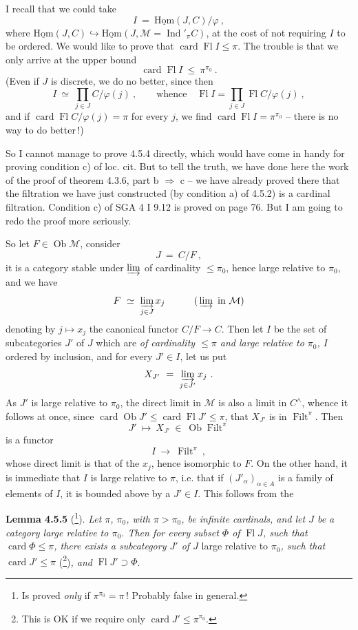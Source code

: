 \documentclass[11pt]{article}
\newcommand{\printedpage}[1]{\marginpar{\footnotesize p.~#1}}
\newcommand{\msp}[1]{\marginpar{\footnotesize [#1]}}
\newcommand{\card}{\operatorname{card}}
\newcommand{\Fl}{\operatorname{Fl}}
\newcommand{\Ob}{\operatorname{Ob}}
\newcommand{\Ind}{\operatorname{Ind}}
\newcommand{\Filt}{\operatorname{Filt}}
\newcommand{\uHom}{\underline{\mathrm{Hom}}}
\begin{document}
\msp{page 111}

I recall that we could take
\[
I \ =\ \uHom(J,C)/\varphi\ ,
\]
where $\uHom(J,C) \hookrightarrow \uHom(J, \mathcal{M} = \Ind'_{\pi}C)$, at the cost of not requiring $I$ to be ordered. We would like to prove that $\card\Fl I \leqslant \pi$. The trouble is that we only arrive at the upper bound
\[
\card\Fl I \ \leqslant\ \pi^{\pi_0}\ .
\]
(Even if $J$ is discrete, we do no better, since then
\[
I \ \simeq\ \prod_{j\in J} C/\varphi(j)\ , \qquad \text{whence} \quad \Fl I = \prod_{j\in J} \Fl C/\varphi(j)\ ,
\]
and if $\card\Fl C/\varphi(j) = \pi$ for every $j$, we find $\card\Fl I = \pi^{\pi_0}$ -- there is no way to do better\,!)

So I cannot manage to prove 4.5.4 directly, which would have come in handy for proving condition c) of loc. cit. But to tell the truth, we have done here the work of the proof of theorem 4.3.6, part b $\Longrightarrow$ c -- we have already proved there that the filtration we have just constructed (by condition a) of 4.5.2) is a cardinal filtration. Condition c) of SGA 4 I 9.12 is proved on page 76. But I am going to redo
\msp{page 112}
the proof more seriously.

So let $F \in \Ob\mathcal{M}$, consider
\[
J \ =\ C/F\ ,
\]
it is a category stable under $\varinjlim$ of cardinality $\leqslant \pi_0$, hence large relative to $\pi_0$, and we have
\[
F \ \simeq\ \varinjlim_{j\in J} x_j \qquad\quad (\,\varinjlim \ \text{in } \mathcal{M})
\]
\printedpage{32}
denoting by $j \longmapsto x_j$ the canonical functor $C/F \longrightarrow C$. Then let $I$ be the set of subcategories $J'$ of $J$ which are \textit{of cardinality $\leqslant \pi$ and large relative to $\pi_0$, $I$} ordered by inclusion, and for every $J' \in I$, let us put
\[
X_{J'} \ =\ \varinjlim_{j\in J'} x_j\ .
\]
As $J'$ is large relative to $\pi_0$, the direct limit in $\mathcal{M}$ is also a limit in $C^{\wedge}$, whence it follows at once, since $\card\Ob J' \leqslant \card\Fl J' \leqslant \pi$, that $X_{J'}$ is in $\Filt^{\pi}$. Then
\[
J' \ \longmapsto\ X_{J'} \ \in\ \Ob\Filt^{\pi}
\]
is a functor
\[
I \ \longrightarrow\ \Filt^{\pi}\ ,
\]
whose direct limit is that of the $x_j$, hence isomorphic to $F$. On the other hand, it is immediate that $I$ is large relative to $\pi$, i.e. that if $(J'_{\alpha})_{\alpha\in A}$ is
\msp{page 113}
a family of elements of $I$, it is bounded above by a $J' \in I$. This follows from the

\textbf{Lemma 4.5.5} (\footnote{Is proved \textit{only} if $\pi^{\pi_0} = \pi$\,! Probably false in general.}). \textit{Let $\pi$, $\pi_0$, with $\pi > \pi_0$, be infinite cardinals, and let $J$ be a category large relative to $\pi_0$. Then for every subset $\Phi$ of} $\Fl J$\textit{, such that} $\card\Phi \leqslant \pi$\textit{, there exists a subcategory $J'$ of $J$} large relative to $\pi_0$\textit{, such that} $\card J' \leqslant \pi$ (\footnote{This is OK if we require only $\card J' \leqslant \pi^{\pi_0}$.})\textit{, and} $\Fl J' \supset \Phi$.
\end{document}

